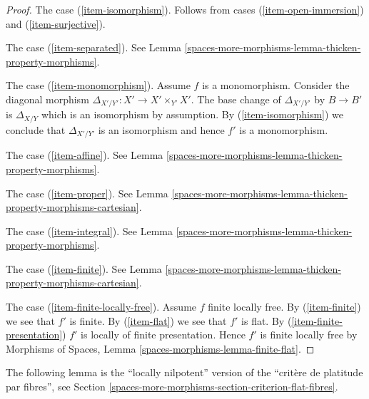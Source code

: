\begin{proof}
\medskip\noindent
The case (\ref{item-isomorphism}). Follows from cases
(\ref{item-open-immersion}) and (\ref{item-surjective}).

\medskip\noindent
The case (\ref{item-separated}). See
Lemma \ref{spaces-more-morphisms-lemma-thicken-property-morphisms}.

\medskip\noindent
The case (\ref{item-monomorphism}). Assume $f$ is a monomorphism.
Consider the diagonal morphism $\Delta_{X'/Y'} : X' \to X' \times_{Y'} X'$.
The base change of $\Delta_{X'/Y'}$ by $B \to B'$ is $\Delta_{X/Y}$
which is an isomorphism by assumption. By (\ref{item-isomorphism})
we conclude that $\Delta_{X'/Y'}$ is an isomorphism and hence
$f'$ is a monomorphism.

\medskip\noindent
The case (\ref{item-affine}). See Lemma \ref{spaces-more-morphisms-lemma-thicken-property-morphisms}.

\medskip\noindent
The case (\ref{item-proper}). See
Lemma \ref{spaces-more-morphisms-lemma-thicken-property-morphisms-cartesian}.

\medskip\noindent
The case (\ref{item-integral}). See
Lemma \ref{spaces-more-morphisms-lemma-thicken-property-morphisms}.

\medskip\noindent
The case (\ref{item-finite}). See
Lemma \ref{spaces-more-morphisms-lemma-thicken-property-morphisms-cartesian}.

\medskip\noindent
The case (\ref{item-finite-locally-free}). Assume $f$ finite locally free.
By (\ref{item-finite}) we see that $f'$ is finite.
By (\ref{item-flat}) we see that $f'$ is flat.
By (\ref{item-finite-presentation}) $f'$ is locally of finite
presentation. Hence $f'$ is finite locally free by
Morphisms of Spaces, Lemma \ref{spaces-morphisms-lemma-finite-flat}.
\end{proof}

The following lemma is the ``locally nilpotent'' version of the
``crit\`ere de platitude par fibres'', see
Section \ref{spaces-more-morphisms-section-criterion-flat-fibres}.

